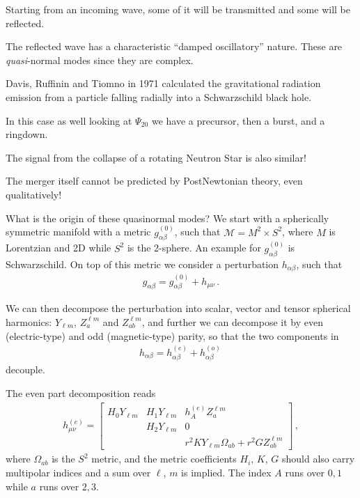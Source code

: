 \documentclass[main.tex]{subfiles}
\begin{document}
Starting from an incoming wave, some of it will be transmitted and some will be reflected. 

The reflected wave has a characteristic ``damped oscillatory'' nature. 
These are \emph{quasi}-normal modes since they are complex. 

Davis, Ruffinin and Tiomno in 1971 calculated the gravitational radiation emission from a particle falling radially into a Schwarzschild black hole. 

In this case as well looking at \(\Psi_{20}\) we have a precursor, then a burst, and a ringdown. 

The signal from the collapse of a rotating Neutron Star is also similar! 

The merger itself cannot be predicted by PostNewtonian theory, even qualitatively! 

What is the origin of these quasinormal modes? 
We start with a spherically symmetric manifold with a metric \(g^{(0)}_{\alpha \beta }\), such that \(\mathcal{M} = M^2 \times S^2\), where \(M\) is Lorentzian and 2D while \(S^{2}\) is the 2-sphere.
An example for \(g_{\alpha \beta }^{(0)}\) is Schwarzschild. On top of this metric we consider a perturbation \(h_{\alpha \beta }\), such that 
%
\begin{align}
g_{\alpha \beta }= g_{\alpha \beta }^{(0)} + h_{\mu \nu }
\,.
\end{align}

We can then decompose the perturbation into scalar, vector and tensor spherical harmonics: \(Y_{\ell m}\), \(Z^{\ell m}_{a}\) and \(Z^{\ell m}_{a b}\), and further we can decompose it by even (electric-type) and odd (magnetic-type) parity, so that the two components in 
%
\begin{align}
h_{ \alpha \beta } = h_{\alpha \beta }^{(e)} + h_{\alpha \beta }^{(o)}
\,
\end{align}
%
decouple. 

The even part decomposition reads 
%
\begin{align}
h_{\mu \nu }^{(e)} = \left[\begin{array}{ccc}
H_0 Y_{\ell m} & H_1 Y_{\ell m} & h_{A}^{(e)} Z^{\ell m}_{a} \\ 
 & H_2 Y_{\ell m} & 0 \\ 
 &  & r^2 K Y_{\ell m} \Omega_{ab} + r^2 G Z^{\ell m}_{ab}
\end{array}\right]
\,,
\end{align}
%
where \(\Omega_{ab}\) is the \(S^2\) metric, and the metric coefficients \(H_i\), \(K\), \(G\) should also carry multipolar indices and a sum over \(\ell\), \(m\) is implied. 
The index \(A\) runs over \(0, 1\) while \(a\) runs over \(2, 3\). 
\end{document}
